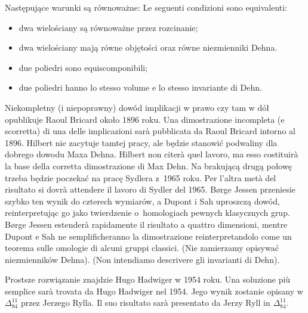 \begin{proposition}
    Następujące warunki są równoważne: %
    Le seguenti condizioni sono equivalenti: %
    \begin{itemize}
    \item dwa wielościany są równoważne przez rozcinanie; %
    \item dwa wielościany mają równe objętości oraz równe niezmienniki Dehna. %
    \item due poliedri sono equiscomponibili; %
    \item due poliedri hanno lo stesso volume e lo stesso invariante di Dehn. %
    \end{itemize}
\end{proposition}

Niekompletny (i niepoprawny) dowód implikacji w prawo czy tam w dół opublikuje Raoul Bricard \cite{bricard_1896} około 1896 roku. %
Una dimostrazione incompleta (e scorretta) di una delle implicazioni sarà pubblicata da Raoul Bricard \cite{bricard_1896} intorno al 1896. %
Hilbert nie zacytuje tamtej pracy, ale będzie stanowić podwaliny dla dobrego dowodu Maxa Dehna. %
Hilbert non citerà quel lavoro, ma esso costituirà la base della corretta dimostrazione di Max Dehn. %
Na brakującą drugą połowę trzeba będzie poczekać na pracę Sydlera \cite{sydler_1965} z~1965 roku. %
Per l'altra metà del risultato si dovrà attendere il lavoro di Sydler \cite{sydler_1965} del 1965. %
Børge Jessen \cite{jessen_1972} przeniesie szybko ten wynik do czterech wymiarów, a Dupont i Sah \cite{dupont_1990} uproszczą dowód, reinterpretując go jako twierdzenie o~homologiach pewnych klasycznych grup. %
Børge Jessen \cite{jessen_1972} estenderà rapidamente il risultato a quattro dimensioni, mentre Dupont e Sah \cite{dupont_1990} ne semplificheranno la dimostrazione reinterpretandolo come un teorema sulle omologie di alcuni gruppi classici. %
(Nie zamierzamy opisywać niezmienników Dehna). %
(Non intendiamo descrivere gli invarianti di Dehn). %

Prostsze rozwiązanie znajdzie Hugo Hadwiger \cite{hadwiger_1950} w 1954 roku. %
Una soluzione più semplice sarà trovata da Hugo Hadwiger \cite{hadwiger_1950} nel 1954. %
Jego wynik zostanie opisany w $\Delta_{84}^{11}$ przez Jerzego Rylla. %
Il suo risultato sarà presentato da Jerzy Ryll in $\Delta_{84}^{11}$. %

